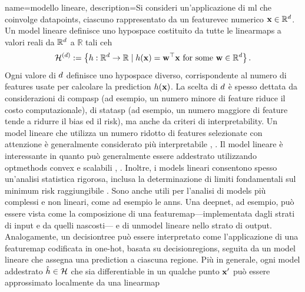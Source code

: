 {name={modello lineare}, 
	description={Si consideri un'applicazione di \gls{ml} che coinvolge \glspl{datapoint},  ciascuno rappresentato da un  
		\gls{featurevec} numerico ${\bf x} \in \mathbb{R}^{d}$. Un \gls{model} lineare definisce  
		uno \gls{hypospace} costituito da tutte le \glspl{linearmap} a valori reali da $\mathbb{R}^{d}$ a $\mathbb{R}$ tali ceh
		\begin{equation}
			\label{equ_def_lin_model_hypspace_dict}
			\mathcal{H}^{(d)} := \left\{ h: \mathbb{R}^{d} \rightarrow \mathbb{R} \mid h({\bf x}) = {\bf w}^{\top} {\bf x} \text{ for some } {\bf w} \in \mathbb{R}^{d} \right\}.
		\end{equation}
		Ogni valore di $d$ definisce uno \gls{hypospace} diverso, corrispondente al numero di 
		\glspl{feature} usate per calcolare la \gls{prediction} $h({\bf x})$. La scelta di
		$d$ è spesso dettata da considerazioni di \gls{compasp} (ad esempio, un numero minore di feature riduce il costo computazionale), 
		di \gls{statasp} (ad esempio, un numero maggiore di feature tende a ridurre il \gls{bias} ed il \gls{risk}), ma anche da criteri di \gls{interpretability}. 
		Un \gls{model} lineare che utilizza un numero ridotto di \glspl{feature} selezionate con attenzione è generalmente considerato 
		più interpretabile \cite{rudin2019stop}, \cite{Ribeiro2016}.
		Il \gls{model} lineare è interessante in quanto può generalmente essere addestrato utilizzando \glspl{optmethod} \gls{convex} e
		scalabili \cite{hastie01statisticallearning}, \cite{BertsekasNonLinProgr}. 
		Inoltre, i \glspl{model} lineari consentono spesso un'analisi statistica rigorosa, inclusa la 
		determinazione di limiti fondamentali sul \gls{minimum} \gls{risk} raggiungibile \cite{Wain2019}. 
		Sono anche utili per l'analisi di \glspl{model} più complessi e non lineari, come ad esempio le \glspl{ann}. 
		Una \gls{deepnet}, ad esempio, può essere vista come la composizione di una \gls{featuremap}—implementata dagli strati di input e da quelli nascosti—
		e di un\gls{model} lineare nello strato di output. Analogamente, un \gls{decisiontree} può essere interpretato come l'applicazione di una 
		\gls{featuremap} codificata in one-hot, basata su \glspl{decisionregion}, seguita 
		da un \gls{model} lineare che assegna una \gls{prediction} a ciascuna regione.		
		Più in generale, ogni \gls{model} addestrato $\hat{h} \in \mathcal{H}$ che sia
		\gls{differentiable} in un qualche punto ${\bf x}'$ può essere approssimato localmente da una \gls{linearmap} 
}}
